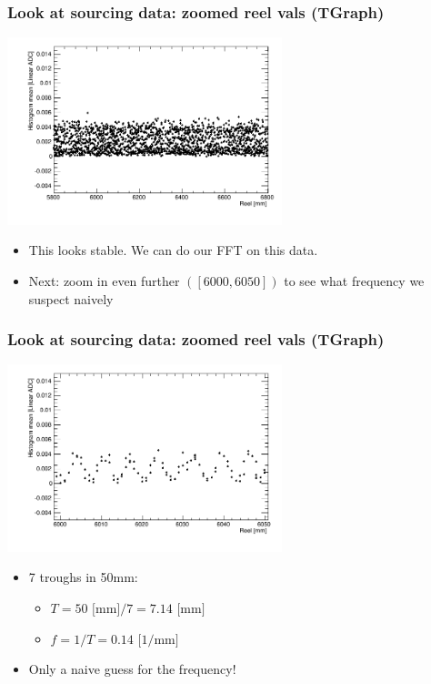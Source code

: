 \documentclass[bigger]{beamer}
\begin{document}
\begin{frame}
\frametitle{Look at sourcing data: zoomed reel vals (TGraph)}
\label{sec-3-1-3}
\label{sec-3-1-3-1}

\centering
\includegraphics[width=0.6\textwidth]{fig/sourcing_zoomed_plot.png}
\begin{itemize}

\item This looks stable.  We can do our FFT on this data.
\label{sec-3-1-3-2}%

\item Next: zoom in even further \(([6000,6050])\) to see what frequency we suspect naively
\label{sec-3-1-3-3}%
\end{itemize} %
\end{frame}
\begin{frame}
\frametitle{Look at sourcing data: zoomed reel vals (TGraph)}
\label{sec-3-1-4}
\label{sec-3-1-4-1}

\centering
\includegraphics[width=0.6\textwidth]{fig/sourcing_very_zoomed_plot.png}
\begin{itemize}

\item 7 troughs in 50mm:
\label{sec-3-1-4-2}%
\begin{itemize}

\item \(T = 50 \text{ [mm]}/ 7 = 7.14 \text{ [mm]} \)
\label{sec-3-1-4-2-1}%

\item \(f = 1/T = 0.14 \text{ [1/mm]}\)
\label{sec-3-1-4-2-2}%
\end{itemize} %

\item Only a naive guess for the frequency!
\label{sec-3-1-4-3}%
\end{itemize} %
\end{frame}
\end{document}
